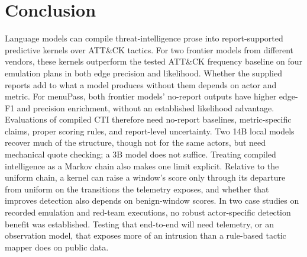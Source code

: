 \documentclass[letterpaper]{article} %
\begin{document}
\section{Conclusion}
Language models can compile threat-intelligence prose into report-supported predictive kernels over ATT\&CK tactics. For two frontier models from different vendors, these kernels outperform the tested ATT\&CK frequency baseline on four emulation plans in both edge precision and likelihood. Whether the supplied reports add to what a model produces without them depends on actor and metric. For menuPass, both frontier models' no-report outputs have higher edge-F1 and precision enrichment, without an established likelihood advantage. Evaluations of compiled CTI therefore need no-report baselines, metric-specific claims, proper scoring rules, and report-level uncertainty. Two 14B local models recover much of the structure, though not for the same actors, but need mechanical quote checking; a 3B model does not suffice. Treating compiled intelligence as a Markov chain also makes one limit explicit. Relative to the uniform chain, a kernel can raise a window's score only through its departure from uniform on the transitions the telemetry exposes, and whether that improves detection also depends on benign-window scores. In two case studies on recorded emulation and red-team executions, no robust actor-specific detection benefit was established. Testing that end-to-end will need telemetry, or an observation model, that exposes more of an intrusion than a rule-based tactic mapper does on public data.



\end{document}
